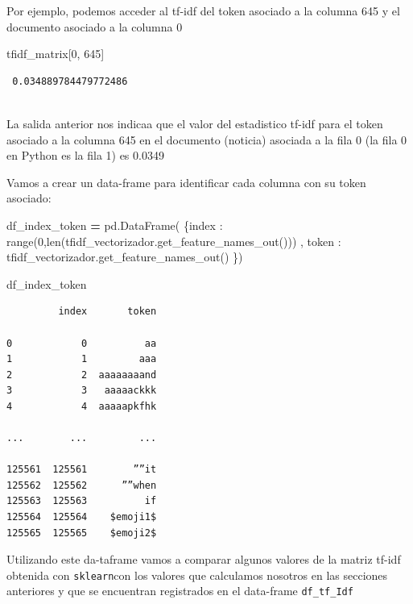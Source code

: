 \documentclass[
  11pt,
  a4paper,
]{article}
\newenvironment{Shaded}{\begin{snugshade}}{\end{snugshade}}
\newcommand{\BuiltInTok}[1]{#1}
\newcommand{\DecValTok}[1]{\textcolor[rgb]{0.00,0.00,0.81}{#1}}
\newcommand{\NormalTok}[1]{#1}
\newcommand{\OperatorTok}[1]{\textcolor[rgb]{0.81,0.36,0.00}{\textbf{#1}}}
\newcommand{\StringTok}[1]{\textcolor[rgb]{0.31,0.60,0.02}{#1}}
\begin{document}
Por ejemplo, podemos acceder al tf-idf del token asociado a la columna
645 y el documento asociado a la columna 0

\begin{Shaded}
\begin{Highlighting}[]
\NormalTok{tfidf\_matrix[}\DecValTok{0}\NormalTok{, }\DecValTok{645}\NormalTok{]}
\end{Highlighting}
\end{Shaded}

\begin{verbatim}
 0.034889784479772486
 
\end{verbatim}

La salida anterior nos indicaa que el valor del estadistico tf-idf para
el token asociado a la columna 645 en el documento (noticia) asociada a
la fila 0 (la fila 0 en Python es la fila 1) es 0.0349

Vamos a crear un data-frame para identificar cada columna con su token
asociado:

\begin{Shaded}
\begin{Highlighting}[]
\NormalTok{df\_index\_token }\OperatorTok{=}\NormalTok{ pd.DataFrame( \{}\StringTok{\textquotesingle{}index\textquotesingle{}}\NormalTok{ : }\BuiltInTok{range}\NormalTok{(}\DecValTok{0}\NormalTok{,}\BuiltInTok{len}\NormalTok{(tfidf\_vectorizador.get\_feature\_names\_out())) , }\StringTok{\textquotesingle{}token\textquotesingle{}}\NormalTok{ : tfidf\_vectorizador.get\_feature\_names\_out() \})}

\NormalTok{df\_index\_token}
\end{Highlighting}
\end{Shaded}

\begin{verbatim}
         index       token

0            0          aa
1            1         aaa
2            2  aaaaaaaand
3            3   aaaaackkk
4            4  aaaaapkfhk

...        ...         ...

125561  125561        ””it
125562  125562      ””when
125563  125563          if
125564  125564    $emoji1$
125565  125565    $emoji2$
\end{verbatim}

Utilizando este da-taframe vamos a comparar algunos valores de la matriz
tf-idf obtenida con \texttt{sklearn}con los valores que calculamos
nosotros en las secciones anteriores y que se encuentran registrados en
el data-frame \texttt{df\_tf\_Idf}
\end{document}
